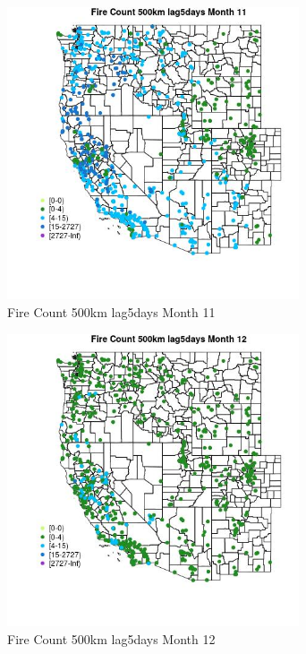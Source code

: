 \begin{figure} 
\centering  
\includegraphics[width=0.77\textwidth]{Code_Outputs/Report_ML_input_PM25_Step4_part_f_de_duplicated_aves_prioritize_24hr_obswNAs_MapObsMo11Fire_Count_500km_lag5days.jpg} 
\caption{\label{fig:Report_ML_input_PM25_Step4_part_f_de_duplicated_aves_prioritize_24hr_obswNAsMapObsMo11Fire_Count_500km_lag5days}Fire Count 500km lag5days Month 11} 
\end{figure} 
 

\clearpage 

\begin{figure} 
\centering  
\includegraphics[width=0.77\textwidth]{Code_Outputs/Report_ML_input_PM25_Step4_part_f_de_duplicated_aves_prioritize_24hr_obswNAs_MapObsMo12Fire_Count_500km_lag5days.jpg} 
\caption{\label{fig:Report_ML_input_PM25_Step4_part_f_de_duplicated_aves_prioritize_24hr_obswNAsMapObsMo12Fire_Count_500km_lag5days}Fire Count 500km lag5days Month 12} 
\end{figure} 
 

